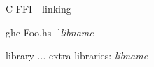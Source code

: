 \begin{frame}[fragile]{C FFI - linking}

\begin{Shaded}
\begin{Highlighting}[]
  ghc Foo.hs -l\emph{libname}


  library
    ...
    extra-libraries:
      {\em libname}
\end{Highlighting}
\end{Shaded}

\end{frame}
